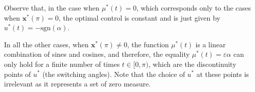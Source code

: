 \documentclass[twocolumn]{autart}    %
\begin{document}
%	

Observe that, in the case when $\mu^\ast(t) = 0$, which corresponds only to the cases when $\bm{x}^\ast(\pi) = 0$, the optimal control is constant and is just given by  $u^\ast (t) =  -\text{sgn} (\alpha)$.

In all the other cases, when $\bm{x}^\ast(\pi)\neq 0$,  
the function $\mu^\ast(t)$ is a linear combination of sines and cosines, and therefore, the equality
$\mu^\ast (t) = \varepsilon\alpha$ can
only hold for a finite number of times $t\in [0,\pi)$, which are the discontinuity points of $u^\ast$ (the switching angles).
Note that the choice of $u^\ast$ at these points is irrelevant as it represents a set of zero measure.
\end{document}
